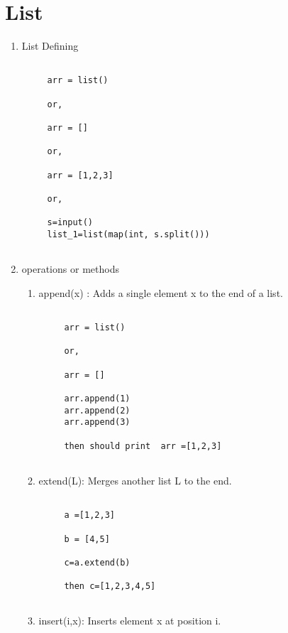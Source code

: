 \documentclass[12pt]{article}
\begin{document}
\section{List} 
\begin{enumerate}
\item  List Defining

\begin{verbatim}
          
     arr = list() 
     
     or, 
     
     arr = [] 
     
     or, 
     
     arr = [1,2,3] 
     
     or, 
     
     s=input()
     list_1=list(map(int, s.split()))
   
\end{verbatim}

\item operations or methods

  \begin{enumerate} 
    \item append(x) : Adds a single element x to the end of a list.
    \begin{verbatim}
          
     arr = list() 
     
     or, 
     
     arr = [] 
    
     arr.append(1)
     arr.append(2)
     arr.append(3)
     
     then should print  arr =[1,2,3]
   
    \end{verbatim}
    
    \item extend(L): Merges another list L to the end. 
    
    \begin{verbatim}
          
     a =[1,2,3]
     
     b = [4,5]
     
     c=a.extend(b)
     
     then c=[1,2,3,4,5] 
   
    \end{verbatim}
    
    \item insert(i,x): Inserts element x at position i. 
    

\end{enumerate}
\end{enumerate}
\end{document}
